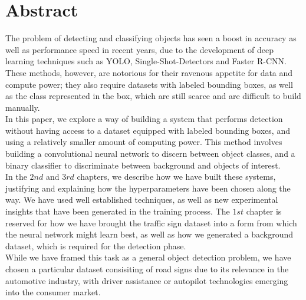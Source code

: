 \chapter*{Abstract}

The problem of detecting and classifying objects has seen a boost in accuracy as well as performance speed in recent years, due to the development of deep learning techniques such as YOLO, Single-Shot-Detectors and Faster R-CNN. These methods, however, are notorious for their ravenous appetite for data and compute power; they also require datasets with labeled bounding boxes, as well as the class represented in the box, which are still scarce and are difficult to build manually.\\

In this paper, we explore a way of building a system that performs detection without having access to a dataset equipped with labeled bounding boxes, and using a relatively smaller amount of computing power. This method involves building a convolutional neural network to discern between object classes, and a binary classifier to discriminate between background and objects of interest.\\

In the $2nd$ and $3rd$ chapters, we describe how we have built these systems, justifying and explaining how the hyperparameters have been chosen along the way. We have used well established techniques, as well as new experimental insights that have been generated in the training process. The $1st$ chapter is reserved for how we have brought the traffic sign dataset into a form from which the neural network might learn best, as well as how we generated a background dataset, which is required for the detection phase.\\

While we have framed this task as a general object detection problem, we have chosen a particular dataset consisiting of road signs due to its relevance in the automotive industry, with driver assistance or autopilot technologies emerging into the consumer market.
